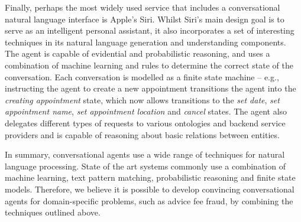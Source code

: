 Finally, perhaps the most widely used service that includes a conversational natural language interface is Apple's Siri. Whilst Siri's main design goal is to serve as an intelligent personal assistant, it also incorporates a set of interesting techniques in its natural language generation and understanding components. The agent is capable of evidential and probabilistic reasoning, and uses a combination of machine learning and rules to determine the correct state of the conversation. Each conversation is modelled as a finite state machine -- e.g., instructing the agent to create a new appointment transitions the agent into the \textit{creating appointment} state, which now allows transitions to the \textit{set date}, \textit{set appointment name}, \textit{set appointment location} and \emph{cancel} states. The agent also delegates different types of requests to various ontologies and backend service providers and is capable of reasoning about basic relations between entities.

In summary, conversational agents use a wide range of techniques for natural language processing. State of the art systems commonly use a combination of machine learning, text pattern matching, probabilistic reasoning and finite state models. Therefore, we believe it is possible to develop convincing conversational agents for domain-specific problems, such as advice fee fraud, by combining the techniques outlined above.